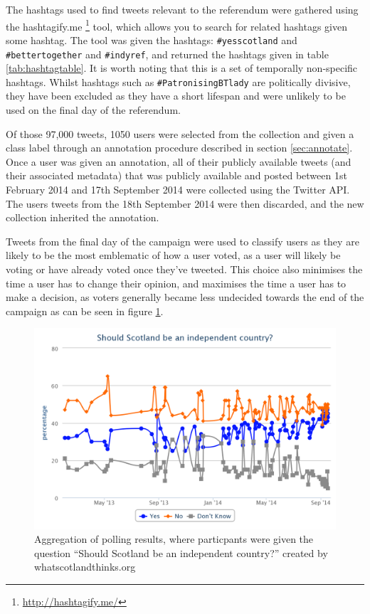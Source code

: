\documentclass[bsc,frontabs,singlespacing,parskip]{infthesis}     %
\begin{document}
The hashtags used to find tweets relevant to the referendum were gathered using the hashtagify.me \footnote{\url{http://hashtagify.me/}} tool, which allows you to search for related hashtags given some hashtag. The tool was given the hashtags: \texttt{\#yesscotland} and \texttt{\#bettertogether} and \texttt{\#indyref}, and returned the hashtags given in table \ref{tab:hashtagtable}. It is worth noting that this is a set of temporally non-specific hashtags. Whilst hashtags such as \texttt{\#PatronisingBTlady}\cite{patronisingbtlady} are politically divisive, they have been excluded as they have a short lifespan and were unlikely to be used on the final day of the referendum. 


Of those 97,000 tweets, 1050 users were selected from the collection and given a class label through an annotation procedure described in section \ref{sec:annotate}. Once a user was given an annotation, all of their publicly available tweets (and their associated metadata) that was publicly available and posted between 1st February 2014 and 17th September 2014 were collected using the Twitter API. The users tweets from the 18th September 2014 were then discarded, and the new collection inherited the annotation.

Tweets from the final day of the campaign were used to classify users as they are likely to be the most emblematic of how a user voted, as a user will likely be voting or have already voted once they've tweeted. This choice also minimises the time a user has to change their opinion, and maximises the time a user has to make a decision, as voters generally became less undecided towards the end of the campaign as can be seen in figure \ref{fig:pollingresults}.

\begin{figure}[]
    \centering
    \includegraphics[width=1\textwidth]{pollingresults.png}
    \caption{Aggregation of polling results, where particpants were given the question ``Should Scotland be an independent country?'' created by whatscotlandthinks.org}
    \label{fig:pollingresults}
\end{figure}
\end{document}
